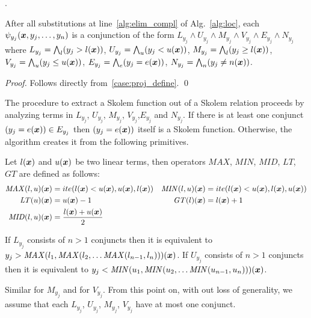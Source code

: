 
.

\begin{lemma}
After all substitutions at line~\ref{alg:elim_compl} of Alg.~\ref{alg:loc}, each $\psi_{y_j}(\vx,y_{j},\ldots,y_{n})$ is a conjunction of the form
$L_{y_j} \land U_{y_j} \land M_{y_j} \land V_{y_j} \land E_{y_j} \land N_{y_j}$ where
%
$L_{y_j} = \Land_{l}(y_j > l(\vx))$, 
$U_{y_j} = \Land_{u}(y_j < u(\vx))$, 
$M_{y_j} = \Land_{l}(y_j \ge l(\vx))$, 
$V_{y_j} = \Land_{u}(y_j \le u(\vx))$, 
$E_{y_j} = \Land_{e}(y_j = e(\vx))$, 
$N_{y_j} = \Land_{n}(y_j \neq n(\vx))$.
%
\end{lemma}
\begin{proof}
Follows directly from~\eqref{case:proj_define}.
\qed
\end{proof}

The procedure to extract a Skolem function out of a Skolem relation proceeds by analyzing terms in $L_{y_j}$, $U_{y_j}$, $M_{y_j}$, $V_{y_j}$,$E_{y_j}$ and $N_{y_j}$.
If there is at least one conjunct $(y_j = e(\vx)) \in E_{y_j}$ then $(y_j = e(\vx))$ itself is a Skolem function.
Otherwise, the algorithm creates it from the following primitives.

\begin{definition}
Let $l(\vx)$ and $u(\vx)$ be two linear terms,
then operators $\mathit{MAX}$, $\mathit{MIN}$, $\mathit{MID}$, $\mathit{LT}$, $\mathit{GT}$ are defined as follows:
\begin{align*}
\mathit{MAX}(l, u) (\vx) &= ite (l (\vx) < u (\vx), u(\vx), l(\vx)) \notag &
\mathit{MIN}(l, u) (\vx) &= ite (l (\vx) < u (\vx), l(\vx), u(\vx)) \notag \\
\mathit{LT} (u) (\vx) &= u (\vx) -1 \notag &
\mathit{GT} (l) (\vx) &= l (\vx) + 1 \notag \\
\mathit{MID}(l, u) (\vx) &= \frac{l(\vx) + u(\vx)}{ 2} \notag 
\end{align*}
\end{definition}

\begin{lemma}
If $L_{y_j}$ consists of $n>1$ conjuncts then it is equivalent to $y_j > \mathit{MAX} (l_1, \mathit{MAX} (l_2,\ldots \mathit{MAX} (l_{n-1}, l_n) )) (\vx)$.
If $U_{y_j}$ consists of $n>1$ conjuncts then it is equivalent to $y_j < \mathit{MIN} (u_1, \mathit{MIN} (u_2,\ldots \mathit{MIN} (u_{n-1}, u_n) ))(\vx)$.
\end{lemma}
Similar for $M_{y_j}$ and for $V_{y_j}$. From this point on, with out
loss of generality, we assume that each $L_{y_j}$, $U_{y_j}$,
$M_{y_j}$, $V_{y_j}$ have at most one conjunct.

